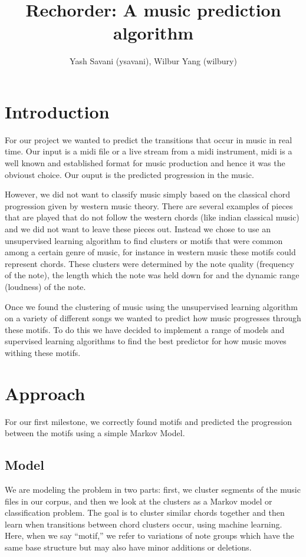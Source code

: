 \documentclass[a4paper, 12pt]{article}
\title{Rechorder: A music prediction algorithm}
\author{Yash Savani (ysavani), Wilbur Yang (wilbury)}
\begin{document}
\maketitle

\section{Introduction}

For our project we wanted to predict the transitions that occur in music in real time. Our input is a midi file or a live stream from a midi instrument, midi is a well known and established format for music production and hence it was the obvioust choice. Our ouput is the predicted progression in the music. 

However, we did not want to classify music simply based on the classical chord progression given by western music theory. There are several examples of pieces that are played that do not follow the western chords (like indian classical music) and we did not want to leave these pieces out. Instead we chose to use an unsupervised learning algorithm to find clusters or motifs that were common among a certain genre of music, for instance in western music these motifs could represent chords. These clusters were determined by the note quality (frequency of the note), the length which the note was held down for and the dynamic range (loudness) of the note. 

Once we found the clustering of music using the unsupervised learning algorithm on a variety of different songs we wanted to predict how music progresses through these motifs. To do this we have decided to implement a range of models and supervised learning algorithms to find the best predictor for how music moves withing these motifs.
\section{Approach}

For our first milestone, we correctly found motifs and predicted the progression between the motifs using a simple Markov Model.

\subsection{Model}

We are modeling the problem in two parts: first, we cluster segments of the music files in our corpus, and then we look at the clusters as a Markov model or classification problem. The goal is to cluster similar chords together and then learn  when transitions between chord clusters occur, using machine learning. Here, when we say ``motif,'' we refer to variations of note groups which have the same base structure but may also have minor additions or deletions.
\end{document}
